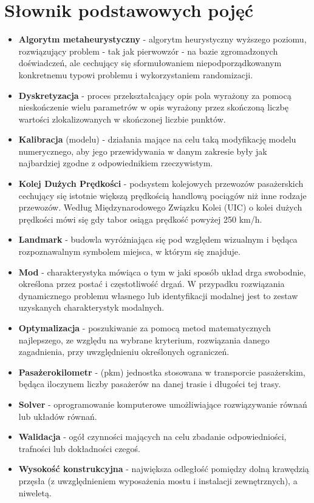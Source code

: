 \section*{Słownik podstawowych pojęć}
\begin{itemize}[label = {},leftmargin=0pt]
\item \textbf{Algorytm metaheurystyczny} - algorytm heurystyczny wyższego poziomu, rozwiązujący problem - tak jak pierwowzór - na bazie zgromadzonych doświadczeń, ale cechujący się sformułowaniem niepodporządkowanym konkretnemu typowi problemu i wykorzystaniem randomizacji. 
\item \textbf{Dyskretyzacja} - proces przekształcający opis pola wyrażony za pomocą nieskończenie wielu parametrów w opis wyrażony przez skończoną liczbę wartości zlokalizowanych w skończonej liczbie punktów.
\item \textbf{Kalibracja} (modelu) - działania mające na celu taką modyfikację modelu numerycznego, aby jego przewidywania w danym zakresie były jak najbardziej zgodne z odpowiednikiem rzeczywistym.
\item \textbf{Kolej Dużych Prędkości} - podsystem kolejowych przewozów pasażerskich cechujący się istotnie większą prędkością handlową pociągów niż inne rodzaje przewozów. Według Międzynarodowego Związku Kolei (UIC) o kolei dużych prędkości mówi się gdy tabor osiąga prędkość powyżej 250 km/h.
\item \textbf{Landmark} - budowla wyróżniająca się pod względem wizualnym i będąca rozpoznawalnym symbolem miejsca, w którym się znajduje.
\item \textbf{Mod}  -  charakterystyka mówiąca o tym w jaki sposób układ drga swobodnie, określona przez postać i częstotliwość drgań. W przypadku rozwiązania dynamicznego problemu własnego lub identyfikacji modalnej jest to zestaw uzyskanych charakterystyk modalnych.
\item \textbf{Optymalizacja} - poszukiwanie za pomocą metod matematycznych najlepszego, ze względu na wybrane kryterium, rozwiązania danego zagadnienia, przy uwzględnieniu określonych ograniczeń.
\item \textbf{Pasażerokilometr} - (pkm) jednostka stosowana w transporcie pasażerskim, będąca iloczynem liczby pasażerów na danej trasie i długości tej trasy.
\item \textbf{Solver} - oprogramowanie komputerowe umożliwiające rozwiązywanie równań lub układów równań.
\item \textbf{Walidacja} - ogół czynności mających na celu zbadanie odpowiedniości, trafności lub dokładności czegoś.
\item \textbf{Wysokość konstrukcyjna} - największa odległość pomiędzy dolną krawędzią przęsła (z uwzględnieniem wyposażenia mostu i instalacji zewnętrznych), a niweletą.

\end{itemize}
\vfill
\pagebreak[4]

